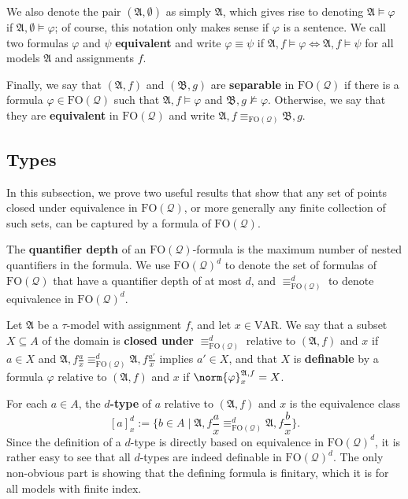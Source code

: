 \documentclass{article}
\theoremstyle{definition}
\begin{document}
We also denote the pair $(\mathfrak{A},\emptyset)$ as simply $\mathfrak{A}$, which gives rise to denoting $\mathfrak{A}\models\varphi$ if $\mathfrak{A},\emptyset\models\varphi$; of course, this notation only makes sense if $\varphi$ is a sentence. We call two formulas $\varphi$ and $\psi$ \textbf{equivalent} and write $\varphi\equiv\psi$ if $\mathfrak{A},f\models\varphi\iff\mathfrak{A},f\models\psi$ for all models $\mathfrak{A}$ and assignments $f$.

Finally, we say that $(\mathfrak{A},f)$ and $(\mathfrak{B},g)$ are \textbf{separable} in $\mathrm{FO}(\mathcal{Q})$ if there is a formula $\varphi\in\mathrm{FO}(\mathcal{Q})$ such that $\mathfrak{A},f\models\varphi$ and $\mathfrak{B},g\not\models \varphi$. Otherwise, we say that they are \textbf{equivalent} in $\mathrm{FO}(\mathcal{Q})$ and write $\mathfrak{A},f\equiv_{\mathrm{FO}(\mathcal{Q})}\mathfrak{B},g$.

\subsection{Types}

In this subsection, we prove two useful results that show that any set of points closed under equivalence in $\mathrm{FO}(\mathcal{Q})$, or more generally any finite collection of such sets, can be captured by a formula of $\mathrm{FO}(\mathcal{Q})$.

The \textbf{quantifier depth} of an $\mathrm{FO}(\mathcal{Q})$-formula is the maximum number of nested quantifiers in the formula. We use $\mathrm{FO}(\mathcal{Q})^d$ to denote the set of formulas of $\mathrm{FO}(\mathcal{Q})$ that have a quantifier depth of at most $d$, and $\equiv^d_{\mathrm{FO}(\mathcal{Q})}$ to denote equivalence in $\mathrm{FO}(\mathcal{Q})^d$.

Let $\mathfrak{A}$ be a $\tau$-model with assignment $f$, and let $x\in\text{VAR}$. We say that a subset $X\subseteq A$ of the domain is \textbf{closed under} $\equiv^d_{\mathrm{FO}(\mathcal{Q})}$ relative to $(\mathfrak{A},f)$ and $x$ if $a \in X$ and $\mathfrak{A},f\frac{a}{x}\equiv^d_{\mathrm{FO}(\mathcal{Q})} \mathfrak{A},f\frac{a'}{x}$ implies $a'\in X$, and that $X$ is \textbf{definable} by a formula $\varphi$ relative to $(\mathfrak{A},f)$ and $x$ if $\norm{\varphi}_x^{\mathfrak{A},f}=X$.

For each $a \in A$, the $d$\textbf{-type} of $a$ relative to $(\mathfrak{A},f)$ and $x$ is the equivalence class
\[
    [a]^d_x:=\{b \in A\mid \mathfrak{A},f\frac{a}{x}\equiv^d_{\mathrm{FO}(\mathcal{Q})}\mathfrak{A},f\frac{b}{x}\}.
\]
Since the definition of a $d$-type is directly based on equivalence in $\mathrm{FO}(\mathcal{Q})^d$, it is rather easy to see that all $d$-types are indeed definable in $\mathrm{FO}(\mathcal{Q})^d$. The only non-obvious part is showing that the defining formula is finitary, which it is for all models with finite index.
\end{document}
